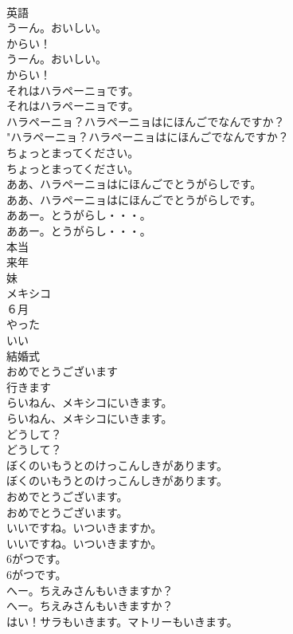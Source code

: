 \documentclass[8pt]{extreport}
\begin{document}
\begin{CJK}{UTF8}{min}
\\	英語
\\	うーん。おいしい。 
\\	からい！	
\\	うーん。おいしい。 
\\	からい！ 
\\	それはハラペーニョです。	
\\	それはハラペーニョです。 
\\	ハラペーニョ？ハラペーニョはにほんごでなんですか？	
\\	"ハラペーニョ？ハラペーニョはにほんごでなんですか？ 
\\	ちょっとまってください。	
\\	ちょっとまってください。 
\\	ああ、ハラペーニョはにほんごでとうがらしです。	
\\	ああ、ハラペーニョはにほんごでとうがらしです。 
\\	ああー。とうがらし・・・。	
\\	ああー。とうがらし・・・。 
\\	本当
\\	来年
\\	妹
\\	メキシコ
\\	６月
\\	やった
\\	いい
\\	結婚式
\\	おめでとうございます
\\	行きます
\\	らいねん、メキシコにいきます。	
\\	らいねん、メキシコにいきます。 
\\	どうして？	
\\	どうして？ 
\\	ぼくのいもうとのけっこんしきがあります。	
\\	ぼくのいもうとのけっこんしきがあります。 
\\	おめでとうございます。	
\\	おめでとうございます。 
\\	いいですね。いついきますか。	
\\	いいですね。いついきますか。 
\\	6がつです。	
\\	6がつです。 
\\	へー。ちえみさんもいきますか？	
\\	へー。ちえみさんもいきますか？ 
\\	はい！サラもいきます。マトリーもいきます。	

\end{CJK}
\end{document}
